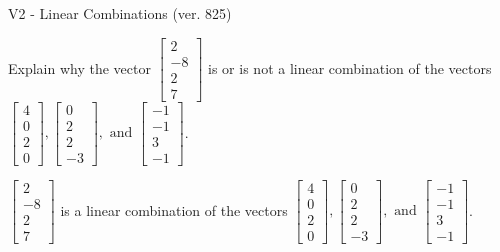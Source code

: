 \begin{exercise}
  \begin{exerciseTitle}V2 - Linear Combinations (ver. 825)\end{exerciseTitle}
  \begin{exerciseStatement}
    Explain why the vector \(\left[\begin{array}{c}
2 \\
-8 \\
2 \\
7
\end{array}\right]\)  is or is not a linear 
	combination of the vectors \(\left[\begin{array}{c}
4 \\
0 \\
2 \\
0
\end{array}\right] , \left[\begin{array}{c}
0 \\
2 \\
2 \\
-3
\end{array}\right] , \text{ and } \left[\begin{array}{c}
-1 \\
-1 \\
3 \\
-1
\end{array}\right]\).
	


  \end{exerciseStatement}
  \begin{exerciseAnswer}
   \(\left[\begin{array}{c}
2 \\
-8 \\
2 \\
7
\end{array}\right]\) 
  	 is  
	a linear combination of the vectors \(\left[\begin{array}{c}
4 \\
0 \\
2 \\
0
\end{array}\right] , \left[\begin{array}{c}
0 \\
2 \\
2 \\
-3
\end{array}\right] , \text{ and } \left[\begin{array}{c}
-1 \\
-1 \\
3 \\
-1
\end{array}\right]\).

	
  


  \end{exerciseAnswer}
\end{exercise}